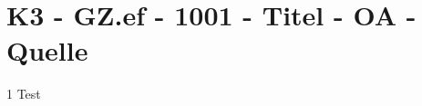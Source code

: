 \section{K3 - GZ.ef - 1001 - Titel - OA - Quelle}

\begin{langesbeispiel} \item[1] %
Test
\end{langesbeispiel}